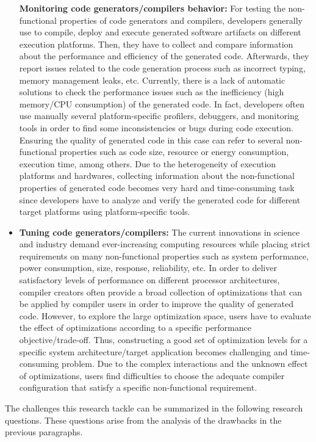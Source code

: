 \begin{itemize}
\textbf{Monitoring code generators/compilers behavior:} For testing the non-functional properties of code generators and compilers, developers generally use to compile, deploy and execute generated software artifacts on different execution platforms. Then, they have to collect and compare information about the performance and efficiency of the generated code. Afterwards, they report issues related to the code generation process such as incorrect typing, memory management leaks, etc.
Currently, there is a lack of automatic solutions to check the performance issues such as the inefficiency (high memory/CPU consumption) of the generated code. In fact, developers often use manually several platform-specific profilers, debuggers, and monitoring tools\cite{guana2014chaintracker,delgado2004taxonomy} in order to find some inconsistencies or bugs during code execution. Ensuring the quality of generated code in this case can refer to several non-functional properties such as code size, resource or energy consumption, execution time, among others\cite{pan2006fast}. Due to the heterogeneity of execution platforms and hardwares, collecting information about the non-functional properties of generated code becomes very hard and time-consuming task since developers have to analyze and verify the generated code for different target platforms using platform-specific tools. 
\item
\textbf{Tuning code generators/compilers:} The current innovations in science and industry demand ever-increasing computing resources while placing strict requirements on many non-functional properties such as system performance, power consumption, size, response, reliability, etc. In order to deliver satisfactory levels of performance on different processor architectures, compiler creators often provide a broad collection of optimizations that can be applied by compiler users in order to improve the quality of generated code. However, to explore the large optimization space, users have to evaluate the effect of optimizations according to a specific performance objective/trade-off. Thus, constructing a good set of optimization levels for a specific system architecture/target application becomes challenging and time-consuming problem. Due to the complex interactions and the unknown effect of optimizations, users find difficulties to choose the adequate compiler configuration that satisfy a specific non-functional requirement.





 


\end{itemize}
The challenges this research tackle can be summarized in the following research questions. These questions arise from the analysis of the drawbacks in the previous paragraphs.

